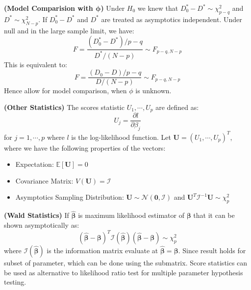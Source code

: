 \begin{remark}{\textbf{(Model Comparision with $\boldsymbol\phi$)}}
    Under $H_0$ we knew that $D_0^* - D^* \sim \chi^2_{p-q}$ and $D^* \sim \chi^2_{N-p}$. If $D^*_0 - D^*$ and $D^*$ are treated as asymptotics independent. Under null and in the large sample limit, we have:
    \begin{equation*}
        F = \frac{(D_0^* - D^*)/p-q}{D^*/(N-p)} \sim F_{p-q, N-p}
    \end{equation*}
    This is equivalent to:
    \begin{equation*}
        F = \frac{(D_0 - D)/p-q}{D/(N-p)} \sim F_{p-q, N-p}
    \end{equation*}
    Hence allow for model comparison, when $\phi$ is unknown.
\end{remark}

\begin{remark}{\textbf{(Other Statistics)}}
    The scores statistic $U_1,\cdots,U_p$ are defined as:
    \begin{equation*}
        U_j = \frac{\partial l}{\partial \beta_j}
    \end{equation*}
    for $j=1,\cdots,p$ where $l$ is the log-likelihood function. Let $\boldsymbol U = (U_1,\cdots,U_p)^T$, where we have the following properties of the vectors:
    \begin{itemize}
        \item Expectation: $\mathbb{E}[\boldsymbol U] = 0$
        \item Covariance Matrix: $V(\boldsymbol U) = \mathcal{I}$
        \item Asymptotics Sampling Distribution: $\boldsymbol U \sim \mathcal{N}(\boldsymbol 0, \mathcal{I})$ and $\boldsymbol U^T\mathcal{I}^{-1}\boldsymbol U \sim \chi^2_p$
    \end{itemize}
\end{remark}

\begin{remark}{\textbf{(Wald Statistics)}}
    If $\hat{\boldsymbol \beta}$ is maximum likelihood estimator of $\boldsymbol \beta$ that it can be shown asymptotically as:
    \begin{equation*}
        (\hat{\boldsymbol \beta} - \boldsymbol \beta)^T\mathcal{I}(\hat{\boldsymbol \beta})(\hat{\boldsymbol \beta} - \boldsymbol \beta) \sim \chi^2_p
    \end{equation*}
    where $\mathcal{I}(\hat{\boldsymbol \beta})$ is the information matrix evaluate at $\hat{\boldsymbol \beta} = \boldsymbol \beta$. Since result holds for subset of parameter, which can be done using the submatrix. Score statistics can be used as alternative to likelihood ratio test for multiple parameter hypothesis testing. 
\end{remark}

